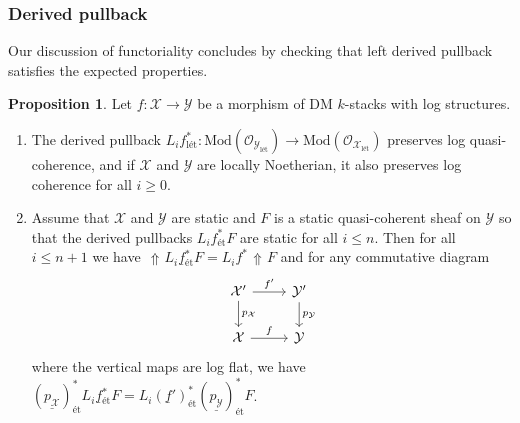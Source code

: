 \documentclass[11pt]{amsart}
\theoremstyle{definition}
\theoremstyle{definition}
\newtheorem{proposition}[theorem]{Proposition}
\DeclareMathOperator{\arrowup}{\!\Uparrow \!}
\newcommand{\ul}[1]{\underline{#1}}
\begin{document}
\subsubsection{Derived pullback} Our discussion of functoriality concludes by checking that left derived pullback satisfies the expected properties. 
\begin{proposition}\label{prop: pullback}
    Let $f\colon \mathcal{X}\rightarrow\mathcal{Y}$ be a morphism of DM $k$-stacks with log structures.
    
    \begin{enumerate}
        \item\label{item: derived pull preserves qcoh} The derived pullback $L_if_\text{l\'et}^*\colon \text{Mod}(\mathcal{O}_{\mathcal{Y}_{\text{l\'et}}})\rightarrow \text{Mod}(\mathcal{O}_{\mathcal{X}_{\text{l\'et}}})$ preserves log quasi-coherence, and if $\mathcal{X}$ and $\mathcal{Y}$ are locally Noetherian, it also preserves log coherence for all $i\geq 0$.
        \item\label{item: derived pull description if static} Assume that $\mathcal{X}$ and $\mathcal{Y}$ are static and $F$ is a static quasi-coherent sheaf on $\mathcal{Y}$ so that the derived pullbacks $L_if_\text{\'et}^*F$ are static for all $i\leq n$. Then for all $i\leq n+1$ we have $\arrowup L_i \underline{f}{}_{\text{\'et}}^*F = L_i f^* \arrowup F$ and for any commutative diagram 
        \begin{equation*}
            \begin{tikzcd}
        \mathcal{X}'\dar["p_\mathcal{X}"] \rar["f'"] &\mathcal{Y}'\dar["p_\mathcal{Y}"]\\ \mathcal{X} \rar["f"]&\mathcal{Y}
            \end{tikzcd}
        \end{equation*}
        where the vertical maps are log flat, we have $ (\underline{p_\mathcal{X}})_\text{\'et}^* L_i \ul{f}{}_\text{\'et}^*F = L_i (\underline{f}')_\text{\'et}^*(\underline{p_\mathcal{Y}})_\text{\'et}^* F$.
    \end{enumerate}
\end{proposition}
\end{document}
